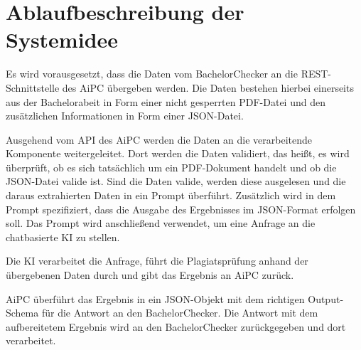 \chapter{Ablaufbeschreibung der Systemidee}\label{ch:ablaufbeschreibung}

Es wird vorausgesetzt, dass die Daten vom BachelorChecker an die \ac{REST}-Schnittstelle des \ac{AiPC} übergeben werden.
Die Daten bestehen hierbei einerseits aus der Bachelorabeit in Form einer nicht gesperrten \ac{PDF}-Datei und den zusätzlichen Informationen in Form einer \ac{JSON}-Datei.

Ausgehend vom \ac{API} des \ac{AiPC} werden die Daten an die verarbeitende Komponente weitergeleitet.
Dort werden die Daten validiert, das heißt, es wird überprüft, ob es sich tatsächlich um ein \ac{PDF}-Dokument handelt und ob die \ac{JSON}-Datei valide ist.
Sind die Daten valide, werden diese ausgelesen und die daraus extrahierten Daten in ein Prompt überführt.
Zusätzlich wird in dem Prompt spezifiziert, dass die Ausgabe des Ergebnisses im \ac{JSON}-Format erfolgen soll.
Das Prompt wird anschließend verwendet, um eine Anfrage an die chatbasierte \ac{KI} zu stellen.

Die \ac{KI} verarbeitet die Anfrage, führt die Plagiatsprüfung anhand der übergebenen Daten durch und gibt das Ergebnis an \ac{AiPC} zurück.

\ac{AiPC} überführt  das Ergebnis in ein \ac{JSON}-Objekt mit dem richtigen Output-Schema für die Antwort an den BachelorChecker.
Die Antwort mit dem aufbereitetem Ergebnis wird an den BachelorChecker zurückgegeben und dort verarbeitet.
